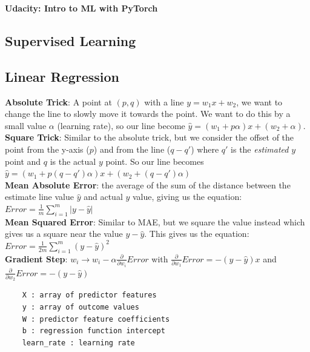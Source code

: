 \documentclass[11pt, a4paper]{article}
\begin{document}
	\begin{titlepage}
		\begin{center} \Huge \textbf{Udacity: Intro to ML with PyTorch} \end{center}
		\tableofcontents
		\newpage
	\end{titlepage}

	\begin{spacing}{1.1}
	\section{Supervised Learning}
	\subsection{Linear Regression}
	\textbf{Absolute Trick}: A point at $(p,q)$ with a line $y = w_1x + w_2$, we want to change the line to slowly move it towards the point. We want to do this by a small value $\alpha$ (learning rate), so our line become $\hat{y} = (w_1 + p\alpha)x + (w_2 + \alpha)$. \vspace*{2mm}\\
	\textbf{Square Trick}: Similar to the absolute trick, but we consider the offset of the point from the y-axis ($p$) and from the line ($q-q'$) where $q'$ is the \textit{estimated} $y$ point and $q$ is the actual $y$ point. So our line becomes $\hat{y} = (w_1 + p(q-q')\alpha)x + (w_2 + (q-q')\alpha)$\vspace*{2mm}\\
	\textbf{Mean Absolute Error}: the average of the sum of the distance between the estimate line value $\hat{y}$ and actual $y$ value, giving us the equation: $Error = \frac{1}{m} \sum_{i=1}^{m}|y-\hat{y}|$ \vspace*{2mm}\\
	\textbf{Mean Squared Error}: Similar to MAE, but we square the value instead which gives us a square near the value $y-\hat{y}$. This gives us the equation: $Error = \frac{1}{2m} \sum_{i=1}^{m}(y-\hat{y})^2$ \vspace*{2mm}\\
	\textbf{Gradient Step}: $w_i \rightarrow w_i - \alpha\frac{\partial}{\partial w_i}Error$ with $\frac{\partial}{\partial w_1}Error = -(y-\hat{y})x$ and $\frac{\partial}{\partial w_2}Error = -(y-\hat{y})$
	\begin{lstlisting}
	X : array of predictor features
	y : array of outcome values
	W : predictor feature coefficients
	b : regression function intercept
	learn_rate : learning rate
	

\end{lstlisting}
\end{spacing}
\end{document}
